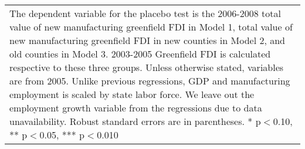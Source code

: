 \begin{table}[!htbp]
\begin{tabular}{l*{3}{c}}
\multicolumn{4}{p{\linewidth}}{\footnotesize The dependent variable for the placebo test is the 2006-2008 total value of new manufacturing greenfield FDI in Model 1, total value of new manufacturing greenfield FDI in new counties in Model 2, and old counties in Model 3. 2003-2005 Greenfield FDI is calculated respective to these three groups. Unless otherwise stated, variables are from 2005. Unlike previous regressions, GDP and manufacturing employment is scaled by state labor force. We leave out the employment growth variable from the regressions due to data unavailability. Robust standard errors are in parentheses. * p$<$0.10, ** p$<$0.05, *** p$<$0.010}\\
\end{tabular}
\end{table}
